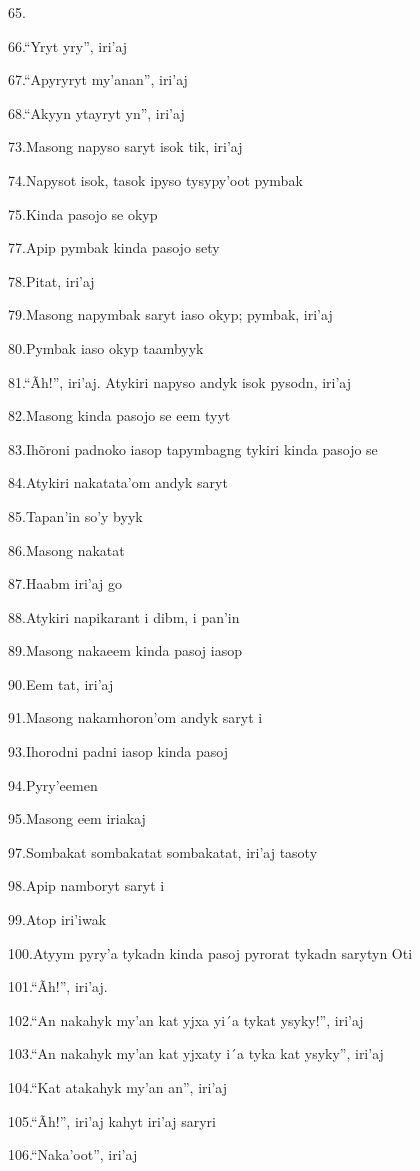 65.

66.``Yryt yry'', iri'aj

67.``Apyryryt my'anan'', iri'aj

68.``Akyyn ytayryt yn'', iri'aj

73.Masong napyso saryt isok tik, iri'aj

74.Napysot isok, tasok ipyso tysypy'oot pymbak

75.Kinda pasojo se okyp

77.Apip pymbak kinda pasojo sety

78.Pitat, iri'aj

79.Masong napymbak saryt iaso okyp; pymbak, iri'aj

80.Pymbak iaso okyp taambyyk

81.``Ãh!'', iri'aj. Atykiri napyso andyk isok pysodn, iri'aj

82.Masong kinda pasojo se eem tyyt

83.Ihõroni padnoko iasop tapymbagng tykiri kinda pasojo se

84.Atykiri nakatata'om andyk saryt

85.Tapan'in so'y byyk

86.Masong nakatat

87.Haabm iri'aj go

88.Atykiri napikarant i dibm, i pan'in

89.Masong nakaeem kinda pasoj iasop

90.Eem tat, iri'aj

91.Masong nakamhoron'om andyk saryt i

93.Ihorodni padni iasop kinda pasoj

94.Pyry'eemen

95.Masong eem iriakaj

97.Sombakat sombakatat sombakatat, iri'aj tasoty

98.Apip namboryt saryt i

99.Atop iri'iwak

100.Atyym pyry'a tykadn kinda pasoj pyrorat tykadn sarytyn Oti

101.``Ãh!'', iri'aj.

102.``An nakahyk my'an kat yjxa yi´a tykat ysyky!'', iri'aj

103.``An nakahyk my'an kat yjxaty i´a tyka kat ysyky'', iri'aj

104.``Kat atakahyk my'an an'', iri'aj

105.``Ãh!'', iri'aj kahyt iri'aj saryri

106.``Naka'oot'', iri'aj

